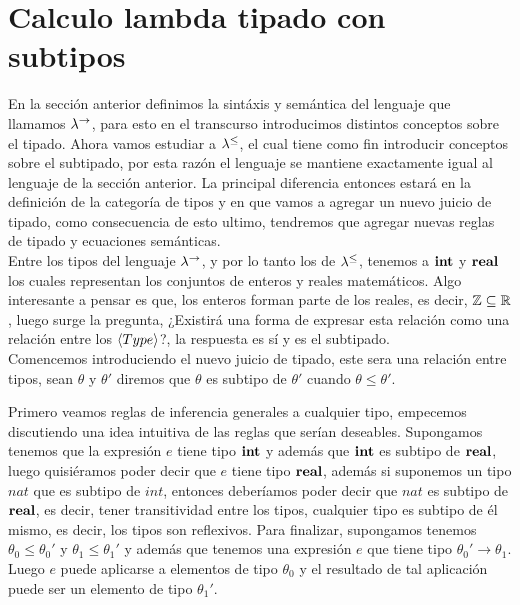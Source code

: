 \chapter{Calculo lambda tipado con subtipos}

En la secci\'on anterior definimos la sint\'axis y sem\'antica del lenguaje que llamamos
$\lambda^{\rightarrow}$, para esto en el transcurso introducimos distintos conceptos sobre el tipado.
Ahora vamos estudiar a $\lambda^{\leq}$, el cual tiene como fin introducir conceptos sobre
el subtipado, por esta raz\'on el lenguaje se mantiene exactamente igual al lenguaje 
de la secci\'on anterior. La principal diferencia entonces estar\'a en la definici\'on
de la categor\'ia de tipos y en que vamos a agregar un nuevo juicio de tipado, como
consecuencia de esto ultimo, tendremos que agregar nuevas reglas de tipado y ecuaciones 
sem\'anticas.\\

Entre los tipos del lenguaje $\lambda^{\rightarrow}$, y por lo tanto los de $\lambda^{\leq}$, tenemos
a $\textbf{int}$ y $\textbf{real}$ los cuales representan los conjuntos de enteros y reales matem\'aticos.
Algo interesante a pensar es que, los enteros forman parte de los reales, es decir,
$\mathbb{Z} \subseteq \mathbb{R}$, luego surge la pregunta, ¿Existir\'a una forma de expresar esta relaci\'on 
como una relaci\'on entre los $\langle Type \rangle$?, la respuesta es s\'i y es el subtipado.\\

Comencemos introduciendo el nuevo juicio de tipado, este sera una relaci\'on entre tipos,
sean $\theta$ y $\theta'$ diremos que $\theta$ es subtipo de $\theta'$ cuando $\theta \leq \theta'$.

Primero veamos reglas de inferencia generales a cualquier tipo, empecemos discutiendo
una idea intuitiva de las reglas que ser\'ian deseables. Supongamos tenemos que la expresi\'on
$e$ tiene tipo $\textbf{int}$ y adem\'as que $\textbf{int}$ es subtipo de $\textbf{real}$, luego quisi\'eramos 
poder decir que $e$ tiene tipo $\textbf{real}$, adem\'as si suponemos un tipo $nat$ que es
subtipo de $int$, entonces deber\'iamos poder decir que $nat$ es subtipo de $\textbf{real}$,
es decir, tener transitividad entre los tipos, cualquier tipo es
subtipo de \'el mismo, es decir, los tipos son reflexivos. Para finalizar, 
supongamos tenemos $\theta_0 \leq \theta_0'$ y $\theta_1 \leq \theta_1'$ y adem\'as
que tenemos una expresi\'on $e$ que tiene tipo $\theta_0' \rightarrow \theta_1$. Luego
$e$ puede aplicarse a elementos de tipo $\theta_0$ y el resultado de tal aplicaci\'on
puede ser un elemento de tipo $\theta_1'$.\\

